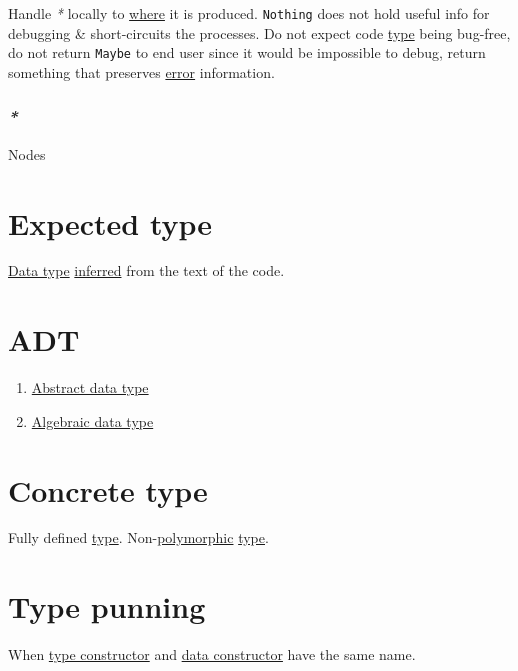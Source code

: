 \documentclass[a4paper,14pt,oneside]{book}
\begin{document}
Handle \emph{*} locally to \hyperref[org514c9de]{where} it is produced. \texttt{Nothing} does not hold useful info for debugging \& short-circuits the processes. Do not expect code \hyperref[orgb064f4e]{type} being bug-free, do not return \texttt{Maybe} to end user since it would be impossible to debug, return something that preserves \hyperref[org11ebac1]{error} information.\\

\subsubsection{\emph{*}}
\label{sec:orgc9072fd}

\label{org3e99859}Nodes\\

\section{\label{org59ba3f6}Expected type}
\label{sec:orgc06236a}
\hyperref[org5a3f461]{Data type} \hyperref[orgb1c0549]{inferred} from the text of the code.\\

\section{\label{org7e313a5}ADT}
\label{sec:org13681de}
\begin{enumerate}
\item \hyperref[org4193707]{Abstract data type}\\
\item \hyperref[orgd9be4be]{Algebraic data type}\\
\end{enumerate}

\section{\label{orgd90ebf3}Concrete type}
\label{sec:orgf9dcb7c}
Fully defined \hyperref[orgb064f4e]{type}. Non-\hyperref[org79790a1]{polymorphic} \hyperref[orgb064f4e]{type}.\\

\section{\label{org916491d}Type punning}
\label{sec:orga549685}
When \hyperref[org4b86fc1]{type constructor} and \hyperref[orgfef0bae]{data constructor} have the same name.\\
\end{document}
